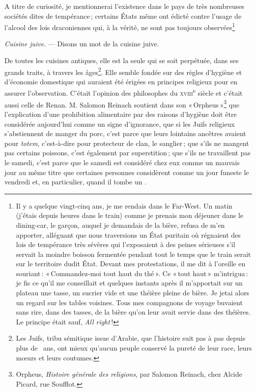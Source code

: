 A titre de curiosité, je mentionnerai l'existence dans le pays de très
nombreuses sociétés dites de tempérance ; certains États même ont édicté contre
l'usage de l'alcool des lois draconiennes qui, à la vérité, ne sont pas
toujours observées\footnote{Il y a quelque vingt-cinq ans, je me rendais dans
le Far-West. Un matin (j'étais depuis {\mmm} heures dans le train) comme
je prenais mon déjeuner dans le dining-car, le garçon, auquel je demandais de
la bière, refusa de m'en apporter, alléguant que nous traversions un État
puritain où régnaient des lois de tempérance très sévères qui l'exposaient
à des peines sérieuses s'il servait la moindre boisson fermentée pendant tout
le temps que le train serait sur le territoire dudit État. Devant mes
protestations, il me dit à l'oreille en souriant : « Commandez-moi tout haut du
thé ». Ce « tout haut » m'intrigua : je fis ce qu'il me conseillait et quelques
instants après il m'apportait sur un plateau une tasse, un sucrier vide et une
théière pleine de bière. Je jetai alors un regard sur les tables voisines. Tous
mes compagnons de voyage buvaient sans rire, dans des tasses, de la bière qu'on
leur avait servie dans des théières. Le principe était sauf, \textit{All
right} !}

\sk

\textit{Cuisine juive}. — Disons un mot de la cuisine juive.
\label{pg0045} \hypertarget{p0045}{}

De toutes les cuisines antiques, elle est la seule qui se soit perpétuée, dans
ses grands traits, à travers les âges\footnote{Les Juifs, tribu sémitique issue
d'Arabie, que l'histoire suit pas à pas depuis plus de
{\mmm} {\mmm} ans, ont mieux qu'aucun peuple conservé la pureté de
leur race, leurs mœurs et leurs coutumes.}. Elle semble fondée sur des règles
d'hygiène et d'économie domestique qui auraient été érigées en principes
religieux pour en assurer l'observation. C'était l'opinion des philosophes du
\textsc{xviii}\textsuperscript{e} siècle et c'était aussi celle de Renan. M.
Salomon Reinach soutient dans son « Orpheus »\footnote{Orpheus,
\textit{Histoire générale des religions}, par Salomon Reinach, chez Alcide
Picard, rue Soufflot.} que l'explication d'une prohibition alimentaire par des
raisons d'hygiène doit être considérée aujourd'hui comme un signe d'ignorance,
que si les Juifs religieux s'abstiennent de manger du porc, c'est parce que
leurs lointains ancêtres avaient pour \textit{totem}, c'est-à-dire pour
protecteur de clan, le sanglier ; que s'ils ne mangent pas certains poissons,
c'est également par superstition ; que s'ils ne travaillent pas le samedi,
c'est parce que le samedi est considéré chez eux comme un mauvais jour au même
titre que certaines personnes considèrent comme un jour funeste le vendredi et,
en particulier, quand il tombe un {\mmm}.

